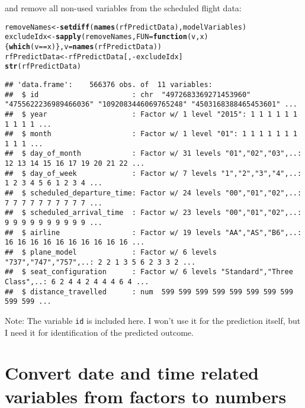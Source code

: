 \documentclass{article}\usepackage[]{graphicx}\usepackage[]{color}
\makeatletter
\newcommand{\hlopt}[1]{\textcolor[rgb]{0,0,0}{#1}}%
\newcommand{\hlstd}[1]{\textcolor[rgb]{0.345,0.345,0.345}{#1}}%
\newcommand{\hlkwa}[1]{\textcolor[rgb]{0.161,0.373,0.58}{\textbf{#1}}}%
\newcommand{\hlkwb}[1]{\textcolor[rgb]{0.69,0.353,0.396}{#1}}%
\newcommand{\hlkwc}[1]{\textcolor[rgb]{0.333,0.667,0.333}{#1}}%
\newcommand{\hlkwd}[1]{\textcolor[rgb]{0.737,0.353,0.396}{\textbf{#1}}}%
\newenvironment{kframe}{%
 \def\at@end@of@kframe{}%
 \ifinner\ifhmode%
  \def\at@end@of@kframe{\end{minipage}}%
  \begin{minipage}{\columnwidth}%
 \fi\fi%
 \def\FrameCommand##1{\hskip\@totalleftmargin \hskip-\fboxsep
 \colorbox{shadecolor}{##1}\hskip-\fboxsep
     \hskip-\linewidth \hskip-\@totalleftmargin \hskip\columnwidth}%
 \MakeFramed {\advance\hsize-\width
   \@totalleftmargin\z@ \linewidth\hsize
   \@setminipage}}%
 {\par\unskip\endMakeFramed%
 \at@end@of@kframe}
\newenvironment{knitrout}{}{} %
\makeatother
\begin{document}
and remove all non-used variables from the scheduled flight data:
\begin{knitrout}
\color{fgcolor}\begin{kframe}
\begin{alltt}
\hlstd{removeNames} \hlkwb{<-} \hlkwd{setdiff}\hlstd{(}\hlkwd{names}\hlstd{(rfPredictData), modelVariables)}
\hlstd{excludeIdx} \hlkwb{<-} \hlkwd{sapply}\hlstd{(removeNames,} \hlkwc{FUN}\hlstd{=}\hlkwa{function}\hlstd{(}\hlkwc{v}\hlstd{,} \hlkwc{x}\hlstd{)\{} \hlkwd{which}\hlstd{(v}\hlopt{==}\hlstd{x)\},} \hlkwc{v}\hlstd{=}\hlkwd{names}\hlstd{(rfPredictData))}
\hlstd{rfPredictData} \hlkwb{<-} \hlstd{rfPredictData[,}\hlopt{-}\hlstd{excludeIdx]}
\hlkwd{str}\hlstd{(rfPredictData)}
\end{alltt}
\begin{verbatim}
## 'data.frame':	566376 obs. of  11 variables:
##  $ id                      : chr  "4972683369271453960" "4755622236989466036" "1092083446069765248" "4503168388465453601" ...
##  $ year                    : Factor w/ 1 level "2015": 1 1 1 1 1 1 1 1 1 1 ...
##  $ month                   : Factor w/ 1 level "01": 1 1 1 1 1 1 1 1 1 1 ...
##  $ day_of_month            : Factor w/ 31 levels "01","02","03",..: 12 13 14 15 16 17 19 20 21 22 ...
##  $ day_of_week             : Factor w/ 7 levels "1","2","3","4",..: 1 2 3 4 5 6 1 2 3 4 ...
##  $ scheduled_departure_time: Factor w/ 24 levels "00","01","02",..: 7 7 7 7 7 7 7 7 7 7 ...
##  $ scheduled_arrival_time  : Factor w/ 23 levels "00","01","02",..: 9 9 9 9 9 9 9 9 9 9 ...
##  $ airline                 : Factor w/ 19 levels "AA","AS","B6",..: 16 16 16 16 16 16 16 16 16 16 ...
##  $ plane_model             : Factor w/ 6 levels "737","747","757",..: 2 2 1 3 5 6 2 3 3 2 ...
##  $ seat_configuration      : Factor w/ 6 levels "Standard","Three Class",..: 6 2 4 4 2 4 4 4 6 4 ...
##  $ distance_travelled      : num  599 599 599 599 599 599 599 599 599 599 ...
\end{verbatim}
\end{kframe}
\end{knitrout}

Note: The variable \verb+id+ is included here. I won't use it for the prediction itself, but I need it for identification of the predicted outcome.

\section{Convert date and time related variables from factors to numbers}
\end{document}
